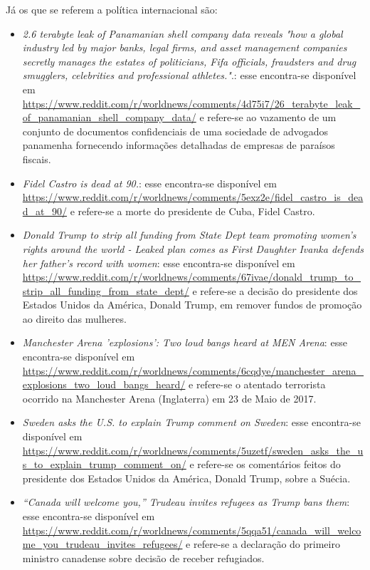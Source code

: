 Já os que se referem a política internacional são:
\begin{itemize}
  \item
  \textit{2.6 terabyte leak of Panamanian shell company data reveals "how a
  global industry led by major banks, legal firms, and asset management companies
  secretly manages the estates of politicians, Fifa officials, fraudsters and
  drug smugglers, celebrities and professional
  athletes."}.: esse encontra-se disponível em
  \url{https://www.reddit.com/r/worldnews/comments/4d75i7/26_terabyte_leak_of_panamanian_shell_company_data/}
  e refere-se ao vazamento de um conjunto de documentos confidenciais de uma
  sociedade de advogados panamenha fornecendo informações detalhadas de
  empresas de paraísos fiscais.
  \item
  \textit{Fidel Castro is dead at
  90.}: esse encontra-se disponível em
  \url{https://www.reddit.com/r/worldnews/comments/5exz2e/fidel_castro_is_dead_at_90/}
  e refere-se a morte do presidente de Cuba, Fidel Castro.
  
  \item
  \textit{Donald Trump to strip all funding from State Dept team promoting
  women's rights around the world - Leaked plan comes as First Daughter Ivanka
  defends her father's record with women}: esse encontra-se disponível em
  \url{https://www.reddit.com/r/worldnews/comments/67ivae/donald_trump_to_strip_all_funding_from_state_dept/}
  e refere-se a decisão do presidente dos Estados Unidos da América, Donald
  Trump, em remover fundos de promoção ao direito das mulheres.
  
  \item
  \textit{Manchester Arena 'explosions': Two loud bangs heard at MEN Arena}:
  esse encontra-se disponível em
  \url{https://www.reddit.com/r/worldnews/comments/6cqdye/manchester_arena_explosions_two_loud_bangs_heard/}
  e refere-se o atentado terrorista ocorrido na Manchester Arena (Inglaterra) em
  23 de Maio de 2017.
  
  \item
  \textit{Sweden asks the U.S. to explain Trump comment on
  Sweden}: esse encontra-se disponível em
  \url{https://www.reddit.com/r/worldnews/comments/5uzetf/sweden_asks_the_us_to_explain_trump_comment_on/}
  e refere-se os comentários feitos do presidente dos Estados Unidos da América, Donald
  Trump, sobre a Suécia.
  
  \item\textit{“Canada will welcome you,” Trudeau invites refugees as Trump bans
  them}: esse encontra-se disponível em
  \url{https://www.reddit.com/r/worldnews/comments/5qqa51/canada_will_welcome_you_trudeau_invites_refugees/}
  e refere-se a declaração do primeiro ministro canadense sobre decisão de
  receber refugiados.
\end{itemize}

